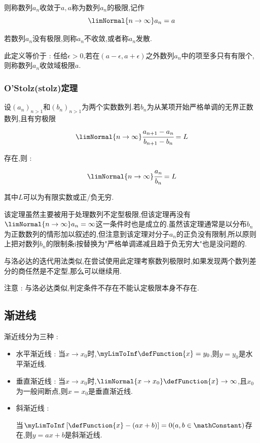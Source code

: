 {{{    则称数列${a_n}$收敛于$a,a$称为数列$a_n$的极限,记作
    $$
      \limNormal{n \to \infty}a_n = a
    $$

    若数列${a_n}$没有极限,则称${a_n}$不收敛,或者称${a_n}$发散.

    此定义等价于 : 任给$\epsilon > 0$,若在$(a - \epsilon,a + \epsilon)$之外数列${a_n}$中的项至多只有有限个,则称数列${a_n}$收敛域极限$a$.
  }%

  \subsubsection{O'Stolz(stolz)定理}{
    设$(a_n)_{n > 1}$和$(b_n)_{n > 1}$为两个实数数列.若$b_n$为从某项开始严格单调的无界正数数列,且有穷极限
    $$
      \limNormal{n \to \infty}\cfrac{a_{n + 1} - a_n}{b_{n + 1} - b_n} = L
    $$

    存在,则 :
    $$
      \limNormal{n \to \infty}\cfrac{a_n}{b_n} = L
    $$

    其中$L$可以为有限实数或正/负无穷.

    该定理虽然主要被用于处理数列不定型极限,但该定理再没有$\limNormal{n \to \infty}a_n = \infty$这一条件时也是成立的.虽然该定理通常是以分布$b_n$为正数数列的情形加以叙述的,但注意到该定理对分子$a_n$的正负没有限制,所以原则上把对数列$b_n$的限制条i按替换为"严格单调递减且趋于负无穷大"也是没问题的.

    与洛必达的迭代用法类似,在尝试使用此定理考察数列极限时,如果发现两个数列差分的商任然是不定型,那么可以继续用.

    注意 : 与洛必达类似,判定条件不存在不能认定极限本身不存在.
  }%

}%

\subsection{渐进线}{
  渐近线分为三种 :
  \begin{itemize}
    \item 水平渐近线 : 当$x \to x_0$时,$\myLimToInf\defFunction{x} = y_0$,则$y = y_0$是水平渐近线.
    \item 垂直渐近线 : 当$x \to x_0$时,$\limNormal{x \to x_0}\defFunction{x} \to \infty$,且$x_0$为一般间断点,则$x = x_0$是垂直渐近线.
    \item {
          斜渐近线 :

          当$\myLimToInf\left[\defFunction{x} - (ax + b)\right] = 0(a,b \in \mathConstant)$存在,则$y = ax + b$是斜渐近线.

}
\end{itemize}}}

